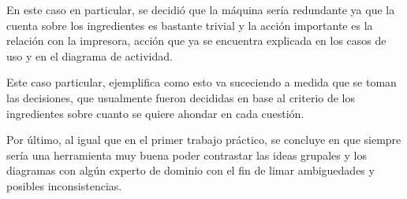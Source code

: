 \documentclass[a4paper,10pt]{article}
\begin{document}
En este caso en particular, se decidi\'o que la m\'aquina ser\'ia redundante ya que la cuenta sobre los ingredientes es bastante trivial y la acci\'on importante
es la relaci\'on con la impresora, acci\'on que ya se encuentra explicada en los casos de uso y en el diagrama de actividad.

Este caso particular, ejemplifica como esto va suceciendo a medida que se toman las decisiones, que usualmente fueron decididas en base al 
criterio de los ingredientes sobre cuanto se quiere ahondar en cada cuesti\'on.

\medskip

Por \'ultimo, al igual que en el primer trabajo pr\'actico, se concluye en que siempre ser\'ia una herramienta muy buena poder contrastar
las ideas grupales y los diagramas con alg\'un experto de dominio con el fin de limar ambiguedades y posibles inconsistencias.
\end{document}
